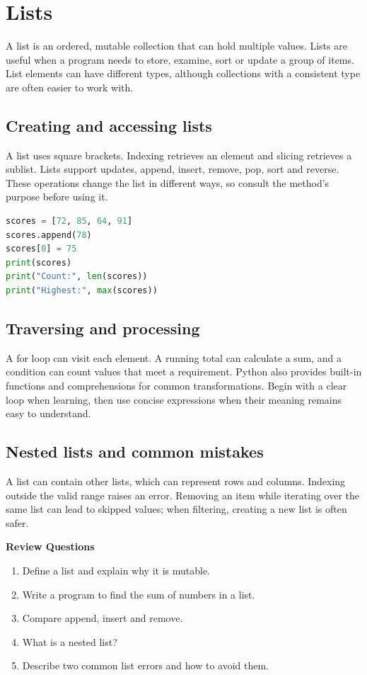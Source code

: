 \documentclass[11pt,openany,oneside]{book}
\newcommand{\reviewtitle}{\par\noindent\textbf{\color{Navy}Review Questions}\par}
\begin{document}
\chapter{Lists}
A list is an ordered, mutable collection that can hold multiple values. Lists are useful when a program needs to store, examine, sort or update a group of items. List elements can have different types, although collections with a consistent type are often easier to work with.

\section{Creating and accessing lists}
A list uses square brackets. Indexing retrieves an element and slicing retrieves a sublist. Lists support updates, append, insert, remove, pop, sort and reverse. These operations change the list in different ways, so consult the method's purpose before using it.

\begin{lstlisting}[style=webcode,language=Python]
scores = [72, 85, 64, 91]
scores.append(78)
scores[0] = 75
print(scores)
print("Count:", len(scores))
print("Highest:", max(scores))
\end{lstlisting}

\section{Traversing and processing}
A for loop can visit each element. A running total can calculate a sum, and a condition can count values that meet a requirement. Python also provides built-in functions and comprehensions for common transformations. Begin with a clear loop when learning, then use concise expressions when their meaning remains easy to understand.

\section{Nested lists and common mistakes}
A list can contain other lists, which can represent rows and columns. Indexing outside the valid range raises an error. Removing an item while iterating over the same list can lead to skipped values; when filtering, creating a new list is often safer.

\reviewtitle
\begin{enumerate}
\item Define a list and explain why it is mutable.
\item Write a program to find the sum of numbers in a list.
\item Compare append, insert and remove.
\item What is a nested list?
\item Describe two common list errors and how to avoid them.
\end{enumerate}
\end{document}
